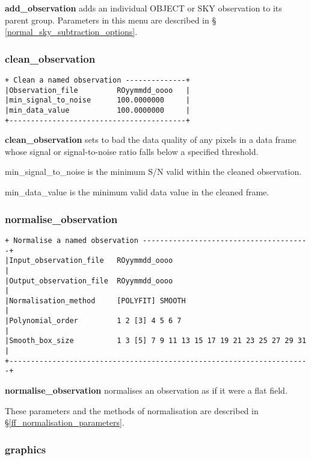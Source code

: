 {{\bf add\_observation} adds an individual {\sf OBJECT} or {\sf SKY} observation
to its parent group. Parameters in this menu are described in \S 
\ref{normal_sky_subtraction_options}.

\subsubsection{clean\_observation}
\begin{verbatim}
+ Clean a named observation --------------+
|Observation_file         ROyymmdd_oooo   |
|min_signal_to_noise      100.0000000     |
|min_data_value           100.0000000     |
+-----------------------------------------+
\end{verbatim}

{\bf clean\_observation} sets to {\sf bad} the data quality of any pixels
in a data frame whose signal or signal-to-noise ratio falls below a
specified threshold.

{\sf min\_signal\_to\_noise} is the minimum S/N valid within the cleaned
observation.

{\sf min\_data\_value} is the minimum valid data value in the cleaned frame.

\subsubsection{normalise\_observation}
\begin{verbatim}
+ Normalise a named observation ---------------------------------------+
|Input_observation_file   ROyymmdd_oooo                                |
|Output_observation_file  ROyymmdd_oooo                                |
|Normalisation_method     [POLYFIT] SMOOTH                             |
|Polynomial_order         1 2 [3] 4 5 6 7                              |
|Smooth_box_size          1 3 [5] 7 9 11 13 15 17 19 21 23 25 27 29 31 |
+----------------------------------------------------------------------+
\end{verbatim}

{\bf normalise\_observation} normalises an observation as if it were a 
flat field.

These parameters and the methods of normalisation are described in
\S \ref{ff_normalisation_parameters}.

\subsubsection{graphics}

}

